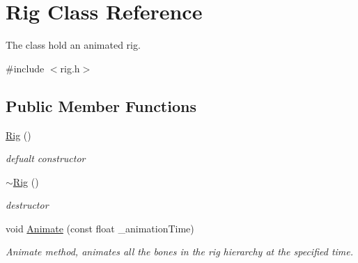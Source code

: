 \hypertarget{classRig}{}\section{Rig Class Reference}
\label{classRig}


The class hold an animated rig.  




{\ttfamily \#include $<$rig.\+h$>$}

\subsection*{Public Member Functions}
\begin{DoxyCompactItemize}
\item 
\hyperlink{classRig_a24197b6817aa84decfd45be248a2b7d5}{Rig} ()\hypertarget{classRig_a24197b6817aa84decfd45be248a2b7d5}{}\label{classRig_a24197b6817aa84decfd45be248a2b7d5}

\begin{DoxyCompactList}\small\item\em defualt constructor \end{DoxyCompactList}\item 
\hyperlink{classRig_a7e295b408d71a2969ecf9d6e2fafea4d}{$\sim$\+Rig} ()\hypertarget{classRig_a7e295b408d71a2969ecf9d6e2fafea4d}{}\label{classRig_a7e295b408d71a2969ecf9d6e2fafea4d}

\begin{DoxyCompactList}\small\item\em destructor \end{DoxyCompactList}\item 
void \hyperlink{classRig_a7fcb3b1e9e344ffb52df977724459bc2}{Animate} (const float \+\_\+animation\+Time)
\begin{DoxyCompactList}\small\item\em Animate method, animates all the bones in the rig hierarchy at the specified time. \end{DoxyCompactList}\end{DoxyCompactItemize}
